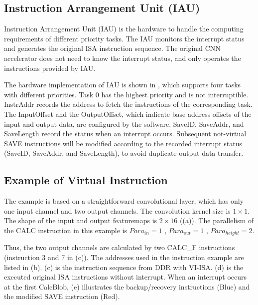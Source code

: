 \subsection{ Instruction Arrangement Unit (IAU) }

Instruction Arrangement Unit (IAU) is the hardware to handle the computing requirements of different priority tasks. The IAU monitors the interrupt status and generates the original ISA instruction sequence. The original CNN accelerator does not need to know the interrupt status, and only operates the instructions provided by IAU.

The hardware implementation of IAU is shown in , which supports four tasks with different priorities. Task 0 has the highest priority and is not interruptible. 
InstrAddr records the address to fetch the instructions of the corresponding task. The InputOffset and the OutputOffset, which indicate base address offsets of the input and output data, are configured by the software. 
SaveID, SaveAddr, and SaveLength record the status when an interrupt occurs. 
Subsequent not-virtual SAVE instructions will be modified according to the recorded interrupt status (SaveID, SaveAddr, and SaveLength), to avoid duplicate output data transfer.


\subsection{Example of Virtual Instruction}
\label{sec:exampleVirtual}


The example is based on a straightforward convolutional layer, which has only one input channel and two output channels. 
The convolution kernel size is $1 \times 1$. The shape of the input and output featuremaps is $ 2 \times 16 $ ((a)). The parallelism of the CALC instruction in this example is $ Para_{in} = 1$ , $ Para_{out}=1$ , $Para_{height}=2$.

Thus, the two output channels are calculated by two CALC\_F instructions (instruction 3 and 7 in (c)). The addresses used in the instruction example are listed in (b). (c) is the instruction sequence from DDR with VI-ISA. (d) is the executed original ISA instructions without interrupt. When an interrupt occurs at the first CalcBlob, (e) illustrates the backup/recovery instructions (Blue) and the modified SAVE instruction (Red). 

